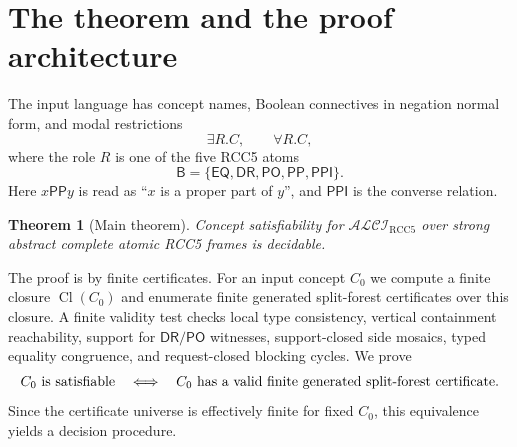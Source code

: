 \documentclass[11pt]{article}
\newtheorem{theorem}{Theorem}[section]
\newcommand{\Logic}{\mathcal{ALCI}_{\mathrm{RCC5}}}
\newcommand{\Base}{\mathsf B}
\newcommand{\EQ}{\mathsf{EQ}}
\newcommand{\DR}{\mathsf{DR}}
\newcommand{\PO}{\mathsf{PO}}
\newcommand{\PP}{\mathsf{PP}}
\newcommand{\PPI}{\mathsf{PPI}}
\newcommand{\Cl}{\operatorname{Cl}}
\begin{document}
\tableofcontents

\section{The theorem and the proof architecture}

The input language has concept names, Boolean connectives in negation normal form, and modal restrictions
\[
   \exists R.C,\qquad \forall R.C,
\]
where the role $R$ is one of the five RCC5 atoms
\[
   \Base=\{\EQ,\DR,\PO,\PP,\PPI\}.
\]
Here $x\PP y$ is read as ``$x$ is a proper part of $y$'', and $\PPI$ is the converse relation.

\begin{theorem}[Main theorem]\label{thm:main}
Concept satisfiability for $\Logic$ over strong abstract complete atomic RCC5 frames is decidable.
\end{theorem}

The proof is by finite certificates.  For an input concept $C_0$ we compute a finite closure $\Cl(C_0)$ and enumerate finite generated split-forest certificates over this closure.  A finite validity test checks local type consistency, vertical containment reachability, support for $\DR/\PO$ witnesses, support-closed side mosaics, typed equality congruence, and request-closed blocking cycles.  We prove
\[
 C_0\hbox{ is satisfiable}
 \quad\Longleftrightarrow\quad
 C_0\hbox{ has a valid finite generated split-forest certificate.}
\]
Since the certificate universe is effectively finite for fixed $C_0$, this equivalence yields a decision procedure.
\end{document}

